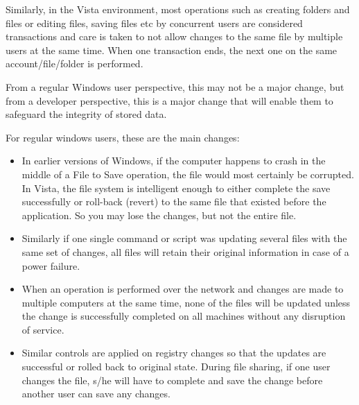 \documentclass[a4paper, 12pt]{article}
\begin{document}
Similarly, in the Vista environment, most operations such as creating folders and files or editing files, saving files etc by concurrent users are considered transactions and care is taken to not allow changes to the same file by multiple users at the same time. When one transaction ends, the next one on the same account/file/folder is performed.

From a regular Windows user perspective, this may not be a major change, but from a developer perspective, this is a major change that will enable them to safeguard the integrity of stored data.

For regular windows users, these are the main changes:
\begin{itemize}
    \item In earlier versions of Windows, if the computer happens to crash in the middle of a File to Save operation, the file would most certainly be corrupted. In Vista, the file system is intelligent enough to either complete the save successfully or roll-back (revert) to the same file that existed before the application. So you may lose the changes, but not the entire file.
    \item Similarly if one single command or script was updating several files with the same set of changes, all files will retain their original information in case of a power failure.
    \item When an operation is performed over the network and changes are made to multiple computers at the same time, none of the files will be updated unless the change is successfully completed on all machines without any disruption of service.
    \item Similar controls are applied on registry changes so that the updates are successful or rolled back to original state. During file sharing, if one user changes the file, s/he will have to complete and save the change before another user can save any changes.
\end{itemize}

\end{document}
